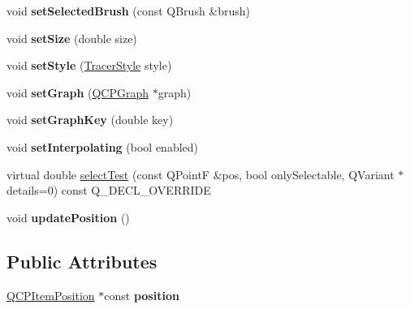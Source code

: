 \begin{DoxyCompactItemize}
void {\bfseries set\+Selected\+Brush} (const Q\+Brush \&brush)
\item 
\mbox{\label{class_q_c_p_item_tracer_ae47fe0617f5fef5fdb766999569be10a}} 
void {\bfseries set\+Size} (double size)
\item 
\mbox{\label{class_q_c_p_item_tracer_a41a2ac4f1acd7897b4e2a2579c03204e}} 
void {\bfseries set\+Style} (\hyperlink{class_q_c_p_item_tracer_a2f05ddb13978036f902ca3ab47076500}{Tracer\+Style} style)
\item 
\mbox{\label{class_q_c_p_item_tracer_af5886f4ded8dd68cb4f3388f390790c0}} 
void {\bfseries set\+Graph} (\hyperlink{class_q_c_p_graph}{Q\+C\+P\+Graph} $\ast$graph)
\item 
\mbox{\label{class_q_c_p_item_tracer_a6840143b42f3b685cedf7c6d83a704c8}} 
void {\bfseries set\+Graph\+Key} (double key)
\item 
\mbox{\label{class_q_c_p_item_tracer_a6c244a9d1175bef12b50afafd4f5fcd2}} 
void {\bfseries set\+Interpolating} (bool enabled)
\item 
virtual double \hyperlink{class_q_c_p_item_tracer_a690bdc69b630e01a16cdd03a883bebbf}{select\+Test} (const Q\+PointF \&pos, bool only\+Selectable, Q\+Variant $\ast$details=0) const Q\+\_\+\+D\+E\+C\+L\+\_\+\+O\+V\+E\+R\+R\+I\+DE
\item 
\mbox{\label{class_q_c_p_item_tracer_a5b90296109e36384aedbc8908a670413}} 
void {\bfseries update\+Position} ()
\end{DoxyCompactItemize}
\subsection*{Public Attributes}
\begin{DoxyCompactItemize}
\item 
\mbox{\label{class_q_c_p_item_tracer_ae65d3a6666f0bfde26a9d3239de6821b}} 
\hyperlink{class_q_c_p_item_position}{Q\+C\+P\+Item\+Position} $\ast$const {\bfseries position}
\end{DoxyCompactItemize}
